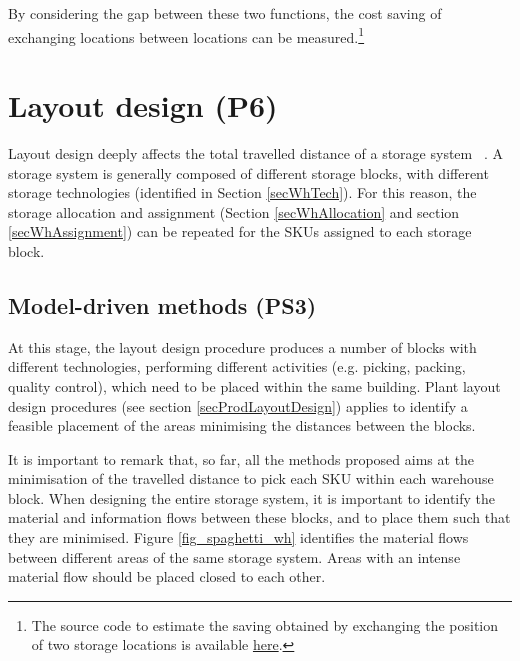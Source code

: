 By considering the gap between these two functions, the cost saving of exchanging locations between locations can be measured.\footnote{The source code to estimate the saving obtained by exchanging the position of two storage locations is available \href{https://github.com/aletuf93/logproj/blob/master/logproj/P6_placementProblem/warehouse_graph_definition.py}{here}.}

\section{Layout design (P6)}
Layout design deeply affects the total travelled distance of a storage system ~\cite{Jaimes2012, Le-Duc1999, Pliskin1982, Tutam2015, Zhang2002}. A storage system is generally composed of different storage blocks, with different storage technologies (identified in Section \ref{secWhTech}). For this reason, the storage allocation and assignment (Section \ref{secWhAllocation} and section \ref{secWhAssignment}) can be repeated for the SKUs assigned to each storage block.

\subsection{Model-driven methods (PS3)}
At this stage, the layout design procedure produces a number of blocks with different technologies, performing different activities (e.g. picking, packing, quality control), which need to be placed within the same building. Plant layout design procedures (see section \ref{secProdLayoutDesign}) applies to identify a feasible placement of the areas minimising the distances between the blocks.\par

It is important to remark that, so far, all the methods proposed aims at the minimisation of the travelled distance to pick each SKU within each warehouse block. When designing the entire storage system, it is important to identify the material and information flows between these blocks, and to place them such that they are minimised. Figure \ref{fig_spaghetti_wh} identifies the material flows between different areas of the same storage system. Areas with an intense material flow should be placed closed to each other.

